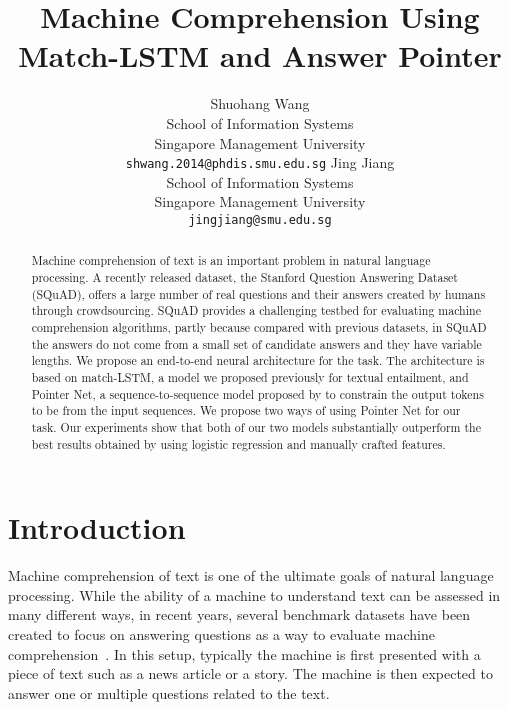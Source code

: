 \documentclass{article} \usepackage{iclr2017_conference,times}
\title{Machine Comprehension Using Match-LSTM and Answer Pointer}
\author{Shuohang Wang\\
		School of Information Systems\\
		Singapore Management University\\ 
		\texttt{shwang.2014@phdis.smu.edu.sg}
	\And 
	Jing Jiang\\
	School of Information Systems\\
	Singapore Management University\\
	\texttt{jingjiang@smu.edu.sg}}
\begin{document}
\maketitle
\begin{abstract}
Machine comprehension of text is an important problem in natural language processing. 
A recently released dataset, the Stanford Question Answering Dataset (SQuAD), offers a large number of real questions and their answers created by humans through crowdsourcing.
SQuAD provides a challenging testbed for evaluating machine comprehension algorithms, partly because compared with previous datasets, in SQuAD the answers do not come from a small set of candidate answers and they have variable lengths.
We propose an end-to-end neural architecture for the task.
The architecture is based on match-LSTM, a model we proposed previously for textual entailment, and Pointer Net, a sequence-to-sequence model proposed by \citet{vinyals2015pointer:NIPS2015} to constrain the output tokens to be from the input sequences.
We propose two ways of using Pointer Net for our task. 
Our experiments show that both of our two models substantially outperform the best results obtained by \citet{rajpurkar2016squad} using logistic regression and manually crafted features.
\end{abstract}

\section{Introduction}
\label{sec:intro}

Machine comprehension of text is one of the ultimate goals of natural language processing.
While the ability of a machine to understand text can be assessed in many different ways, in recent years, several benchmark datasets have been created to focus on answering questions as a way to evaluate machine comprehension~\citep{richardsonmctest:EMNLP2013, hermann2015teaching:nips2015, hill2015goldilocks:ICLR2016, weston2015towards:ICLR2016, rajpurkar2016squad}.
In this setup, typically the machine is first presented with a piece of text such as a news article or a story.
The machine is then expected to answer one or multiple questions related to the text.
\end{document}
